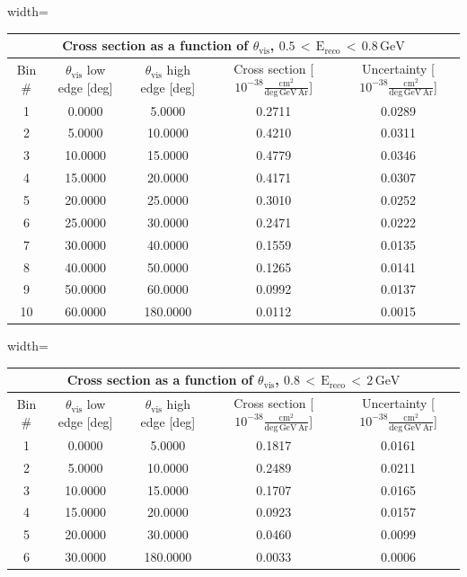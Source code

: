 \begin{table}[H]
\raggedright
\begin{adjustbox}{width=\textwidth}
\small
\begin{tabular}{ |c|c|c|c|c| }
\hline
\multicolumn{5}{|c|}{Cross section as a function of $\theta_{\mathrm{vis}}$, $\mathrm{0.5\,<\,E_{re\textit{c}o}\,<\,0.8\,GeV}$} \\
\hline
\hline
Bin \# & $\theta_{\mathrm{vis}}$ low edge [deg] & $\theta_{\mathrm{vis}}$ high edge [deg] & Cross section [$10^{-38}\mathrm{\frac{cm^{2}}{deg\,GeV\,Ar}}$] & Uncertainty [$10^{-38}\mathrm{\frac{cm^{2}}{deg\,GeV\,Ar}}$] \\
\hline
\hline
1 & 0.0000 & 5.0000 & 0.2711 & 0.0289\\
2 & 5.0000 & 10.0000 & 0.4210 & 0.0311\\
3 & 10.0000 & 15.0000 & 0.4779 & 0.0346\\
4 & 15.0000 & 20.0000 & 0.4171 & 0.0307\\
5 & 20.0000 & 25.0000 & 0.3010 & 0.0252\\
6 & 25.0000 & 30.0000 & 0.2471 & 0.0222\\
7 & 30.0000 & 40.0000 & 0.1559 & 0.0135\\
8 & 40.0000 & 50.0000 & 0.1265 & 0.0141\\
9 & 50.0000 & 60.0000 & 0.0992 & 0.0137\\
10 & 60.0000 & 180.0000 & 0.0112 & 0.0015\\
\hline
\end{tabular}
\end{adjustbox}
\end{table}


\begin{table}[H]
\raggedright
\begin{adjustbox}{width=\textwidth}
\small
\begin{tabular}{ |c|c|c|c|c| }
\hline
\multicolumn{5}{|c|}{Cross section as a function of $\theta_{\mathrm{vis}}$, $\mathrm{0.8\,<\,E_{re\textit{c}o}\,<\,2\,GeV}$} \\
\hline
\hline
Bin \# & $\theta_{\mathrm{vis}}$ low edge [deg] & $\theta_{\mathrm{vis}}$ high edge [deg] & Cross section [$10^{-38}\mathrm{\frac{cm^{2}}{deg\,GeV\,Ar}}$] & Uncertainty [$10^{-38}\mathrm{\frac{cm^{2}}{deg\,GeV\,Ar}}$] \\
\hline
\hline
1 & 0.0000 & 5.0000 & 0.1817 & 0.0161\\
2 & 5.0000 & 10.0000 & 0.2489 & 0.0211\\
3 & 10.0000 & 15.0000 & 0.1707 & 0.0165\\
4 & 15.0000 & 20.0000 & 0.0923 & 0.0157\\
5 & 20.0000 & 30.0000 & 0.0460 & 0.0099\\
6 & 30.0000 & 180.0000 & 0.0033 & 0.0006\\
\hline
\end{tabular}
\end{adjustbox}
\end{table}


